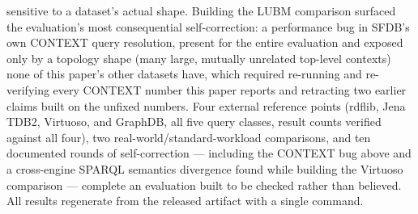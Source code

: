 sensitive to a dataset's actual shape. Building the LUBM comparison
surfaced the evaluation's most consequential self-correction: a
performance bug in SFDB's own CONTEXT query resolution, present for the
entire evaluation and exposed only by a topology shape (many large,
mutually unrelated top-level contexts) none of this paper's other
datasets have, which required re-running and re-verifying every
CONTEXT number this paper reports and retracting two earlier claims
built on the unfixed numbers. Four external reference points (rdflib, Jena TDB2, Virtuoso, and
GraphDB,
all five query classes, result counts verified against all four), two
real-world/standard-workload comparisons, and ten documented
rounds of self-correction --- including the CONTEXT bug above and a
cross-engine SPARQL semantics divergence found while building the
Virtuoso comparison ---
complete an evaluation built to be checked rather than believed. All
results regenerate from the released artifact with a single command.
